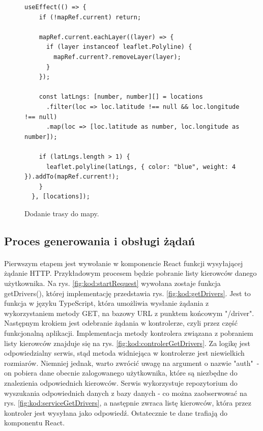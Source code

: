 \begin{figure}
\centering
\begin{lstlisting}
useEffect(() => {
    if (!mapRef.current) return;
  
    mapRef.current.eachLayer((layer) => {
      if (layer instanceof leaflet.Polyline) {
        mapRef.current?.removeLayer(layer);
      }
    });
  
    const latLngs: [number, number][] = locations
      .filter(loc => loc.latitude !== null && loc.longitude !== null)
      .map(loc => [loc.latitude as number, loc.longitude as number]);
  
    if (latLngs.length > 1) {
      leaflet.polyline(latLngs, { color: "blue", weight: 4 }).addTo(mapRef.current!);
    }
  }, [locations]);
\end{lstlisting}
\caption{Dodanie trasy do mapy.}
\label{fig:kod:polyline}
\end{figure}


\subsection{Proces generowania i obsługi żądań}
\paragraph{}
Pierwszym etapem jest wywołanie w komponencie React funkcji wysyłającej żądanie HTTP. Przykładowym procesem będzie pobranie listy kierowców danego użytkownika. Na rys. \ref{fig:kod:startRequest} wywołana zostaje funkcja getDrivers(), której implementację przedstawia rys. \ref{fig:kod:getDrivers}. Jest to funkcja w języku TypeScript, która umożliwia wysłanie żądania z wykorzystaniem metody GET, na bazowy URL z punktem końcowym "/driver". Następnym krokiem jest odebranie żądania w kontrolerze, czyli przez część funkcjonalną aplikacji. Implementacja metody kontrolera związana z pobraniem listy kierowców znajduje się na rys. \ref{fig:kod:controlerGetDrivers}. Za logikę jest odpowiedzialny serwis, stąd metoda widniejąca w kontrolerze jest niewielkich rozmiarów. Niemniej jednak, warto zwrócić uwagę na argument o nazwie "auth"\ - on pobiera dane obecnie zalogowanego użytkownika, które są niezbędne do znalezienia odpowiednich kierowców. Serwis wykorzystuje repozytorium do wyszukania odpowiednich danych z bazy danych - co można zaobserwować na rys. \ref{fig:kod:serviceGetDrivers}, a następnie zwraca listę kierowców, która przez kontroler jest wysyłana jako odpowiedź. Ostatecznie te dane trafiają do komponentu React.


